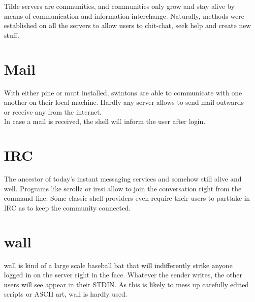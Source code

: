 Tilde servers are communities, and communities only grow and stay alive by means of communication and information interchange. Naturally, methods were established on all the servers to allow users to chit-chat, seek help and create new stuff.

\section{Mail}
With either pine or mutt installed, swintons are able to communicate with one another on their local machine. Hardly any server allows to send mail outwards or receive any from the internet.\\
In case a mail is received, the shell will inform the user after login.

\section{IRC}
The ancestor of today's instant messaging services and somehow still alive and well. Programs like scrollz or irssi allow to join the conversation right from the command line. Some classic shell providers even require their users to parttake in IRC as to keep the community connected.

\section{wall}
wall is kind of a large scale baseball bat that will indifferently strike anyone logged in on the server right in the face. Whatever the sender writes, the other users will see appear in their STDIN. As this is likely to mess up carefully edited scripts or ASCII art, wall is hardly used.